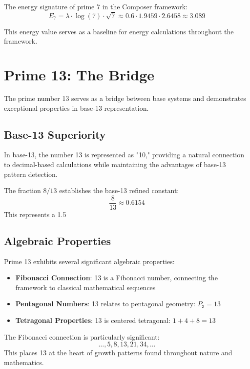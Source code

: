 \documentclass[12pt,a4paper]{report}
\begin{document}
The energy signature of prime 7 in the Composer framework:
\[
E_7 = \lambda \cdot \log(7) \cdot \sqrt{7} \approx 0.6 \cdot 1.9459 \cdot 2.6458 \approx 3.089
\]

This energy value serves as a baseline for energy calculations throughout the framework.

\section{Prime 13: The Bridge}

The prime number 13 serves as a bridge between base systems and demonstrates exceptional properties in base-13 representation.

\subsection{Base-13 Superiority}

In base-13, the number 13 is represented as "10," providing a natural connection to decimal-based calculations while maintaining the advantages of base-13 pattern detection.

The fraction $8/13$ establishes the base-13 refined constant:
\[
\frac{8}{13} \approx 0.6154
\]
This represents a 1.5%

\subsection{Algebraic Properties}

Prime 13 exhibits several significant algebraic properties:

\begin{itemize}
\item \textbf{Fibonacci Connection}: 13 is a Fibonacci number, connecting the framework to classical mathematical sequences
\item \textbf{Pentagonal Numbers}: 13 relates to pentagonal geometry: $P_3 = 13$
\item \textbf{Tetragonal Properties}: 13 is centered tetragonal: $1 + 4 + 8 = 13$
\end{itemize}

The Fibonacci connection is particularly significant:
\[
\ldots, 5, 8, 13, 21, 34, \ldots
\]
This places 13 at the heart of growth patterns found throughout nature and mathematics.
\end{document}
